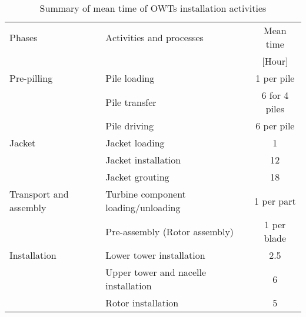 
\begin{table}
\label{tab:times}

\begin{tabular}{llc}
\hline 
Phases & Activities and processes & Mean time \\ 
& & [Hour] \\ 
\hline 
Pre-pilling & Pile loading & 1 per pile \\
 & Pile transfer & 6 for 4 piles\\
 & Pile driving & 6 per pile\\
\hline
Jacket & Jacket loading & 1\\
 & Jacket installation & 12\\
 & Jacket grouting & 18\\
\hline
Transport and assembly & Turbine component loading/unloading & 1 per part\\
 & Pre-assembly (Rotor assembly) & 1 per blade  \\
\hline
Installation & Lower tower installation & 2.5\\
 & Upper tower and nacelle installation & 6\\
 & Rotor installation & 5\\
\hline 
\end{tabular} 

\caption{Summary of mean time of OWTs installation activities}
\end{table}
